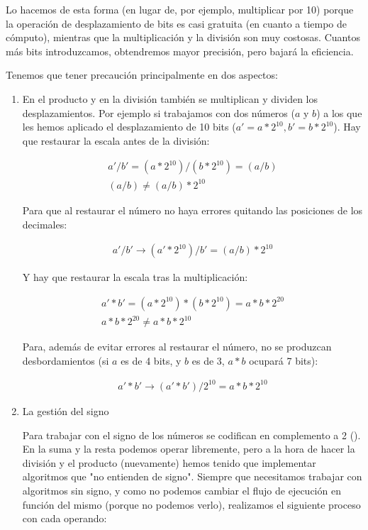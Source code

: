 Lo hacemos de esta forma (en lugar de, por ejemplo, multiplicar por 10) porque la operación de desplazamiento de bits es casi gratuita (en cuanto a tiempo de cómputo), mientras que la multiplicación y la división son muy costosas. Cuantos más bits introduzcamos, obtendremos mayor precisión, pero bajará la eficiencia.

Tenemos que tener precaución principalmente en dos aspectos:

\begin{enumerate}

  \item En el producto y en la división también se multiplican y dividen los desplazamientos. Por ejemplo si trabajamos con dos números ($a$ y $b$) a los que les hemos aplicado el desplazamiento de 10 bits ($ a' = a * 2^{10}, b' = b * 2^{10} $). Hay que restaurar la escala antes de la división:

  \begin{gather}
    \label{form:float_bits_product}
    a' / b' = ( a * 2^{10} ) / ( b * 2^{10} ) = (a / b) \\
    (a / b) \neq (a / b) * 2^{10}
  \end{gather}

  Para que al restaurar el número no haya errores quitando las posiciones de los decimales:

  \begin{gather}
    a' / b' \rightarrow (a' * 2^{10})/b' = (a / b) * 2^{10}
  \end{gather}

  Y hay que restaurar la escala tras la multiplicación:

  \begin{gather}
    a' * b' = ( a * 2^{10} ) * ( b * 2^{10} ) = a * b * 2^{20} \\
    a * b * 2^{20} \neq a * b * 2^{10}
  \end{gather}

  Para, además de evitar errores al restaurar el número, no se produzcan desbordamientos (si $a$ es de 4 bits, y $b$ es de 3, $ a * b $ ocupará 7 bits):

  \begin{gather}
    a' * b' \rightarrow (a' * b') / 2^{10} = a * b * 2^{10}
  \end{gather}

  \item La gestión del signo

  Para trabajar con el signo de los números se codifican en complemento a 2 (\cite{wikipedia_contributors._complemento_2019}). En la suma y la resta podemos operar libremente, pero a la hora de hacer la división y el producto (nuevamente) hemos tenido que implementar algoritmos que "no entienden de signo".  Siempre que necesitamos trabajar con algoritmos sin signo, y como no podemos cambiar el flujo de ejecución en función del mismo (porque no podemos verlo), realizamos el siguiente proceso con cada operando:


\end{enumerate}
